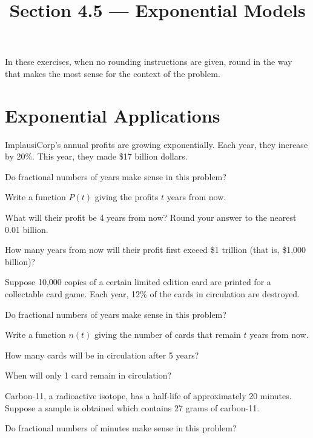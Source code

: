 

\title{Section 4.5 --- Exponential Models}


\maketitle
\noindent In these exercises, when no rounding instructions are given, round in the way that makes the most sense for the context of the problem.
\section*{Exponential Applications}
\begin{senum}
\item ImplausiCorp's annual profits are growing exponentially.  Each year, they increase by 20\%.  This year, they made \$17 billion dollars.
\begin{clist}
\item Do fractional numbers of years make sense in this problem?
\item Write a function $P(t)$ giving the profits $t$ years from now.
\item What will their profit be 4 years from now?  Round your answer to the nearest 0.01 billion.
\item How many years from now will their profit first exceed \$1 trillion (that is, \$1,000 billion)?
\end{clist}
\item Suppose 10,000 copies of a certain limited edition card are printed for a collectable card game.  Each year, 12\% of the cards in circulation are destroyed.
\begin{clist}
\item Do fractional numbers of years make sense in this problem?
\item Write a function $n(t)$ giving the number of cards that remain $t$ years from now.
\item How many cards will be in circulation after 5 years?
\item When will only 1 card remain in circulation?
\end{clist}
\item Carbon-11, a radioactive isotope, has a half-life of approximately 20 minutes.  Suppose a sample is obtained which contains 27 grams of carbon-11.
\begin{clist}
\item Do fractional numbers of minutes make sense in this problem?

\end{clist}
\end{senum}
